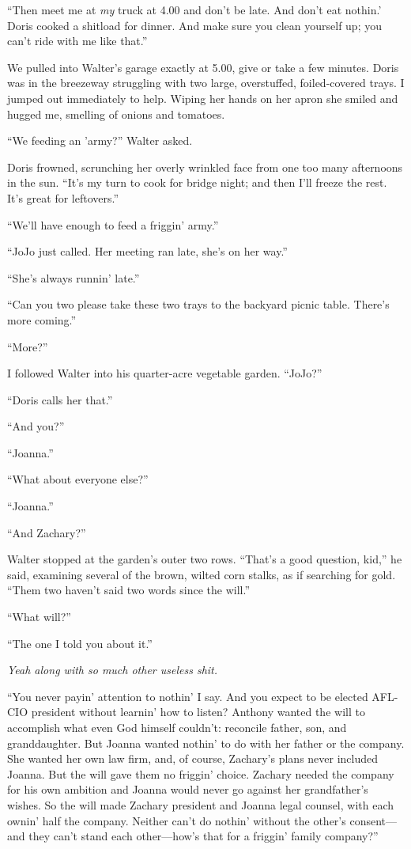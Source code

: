 ``Then meet me at \emph{my} truck at 4.00 and don't be late. And don't
eat nothin.' Doris cooked a shitload for dinner. And make sure you clean
yourself up; you can't ride with me like that.''

We pulled into Walter's garage exactly at 5.00, give or take a few
minutes. Doris was in the breezeway struggling with two large,
overstuffed, foiled-covered trays. I jumped out immediately to help.
Wiping her hands on her apron she smiled and hugged me, smelling of
onions and tomatoes.

``We feeding an 'army?'' Walter asked.

Doris frowned, scrunching her overly wrinkled face from one too many
afternoons in the sun. ``It's my turn to cook for bridge night; and then
I'll freeze the rest. It's great for leftovers.''

``We'll have enough to feed a friggin' army.''

``JoJo just called. Her meeting ran late, she's on her way.''

``She's always runnin' late.''

``Can you two please take these two trays to the backyard picnic table.
There's more coming.''

``More?''

I followed Walter into his quarter-acre vegetable garden. ``JoJo?''

``Doris calls her that.''

``And you?''

``Joanna.''

``What about everyone else?''

``Joanna.''

``And Zachary?''

Walter stopped at the garden's outer two rows. ``That's a good question,
kid,'' he said, examining several of the brown, wilted corn stalks, as
if searching for gold. ``Them two haven't said two words since the
will.''

``What will?''

``The one I told you about it.''

\emph{Yeah along with so much other useless shit.}

``You never payin' attention to nothin' I say. And you expect to be
elected AFL-CIO president without learnin' how to listen? Anthony wanted
the will to accomplish what even God himself couldn't: reconcile father,
son, and granddaughter. But Joanna wanted nothin' to do with her father
or the company. She wanted her own law firm, and, of course, Zachary's
plans never included Joanna. But the will gave them no friggin' choice.
Zachary needed the company for his own ambition and Joanna would never
go against her grandfather's wishes. So the will made Zachary president
and Joanna legal counsel, with each ownin' half the company. Neither
can't do nothin' without the other's consent---and they can't stand each
other---how's that for a friggin' family company?''

